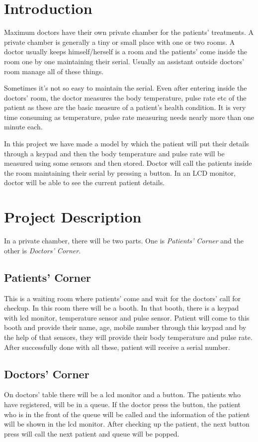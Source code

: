 \documentclass[a4paper,12pt]{article}
\begin{document}
	\thispagestyle{empty}
	\pagebreak
	\tableofcontents
	\thispagestyle{empty}
	\clearpage
	
	
	\section{Introduction}
	Maximum doctors have their own private chamber for the patients' treatments. A private chamber is generally a tiny or small place with one or two rooms. A doctor usually keeps himself/herself is a room and the patients' come inside the room one by one maintaining their serial. Usually an assistant outside doctors' room manage all of these things.
	
	Sometimes it's not so easy to maintain the serial. Even after entering inside the doctors' room, the doctor measures the body temperature, pulse rate etc of the patient as these are the basic measure of a patient's health condition. It is very time consuming as temperature, pulse rate measuring needs nearly more than one minute each. 
	
	In this project we have made a model by which the patient will put their details through a keypad and then the body temperature and pulse rate will be measured using some sensors and then stored. Doctor will call the patients inside the room maintaining their serial by pressing a button. In an LCD monitor, doctor will be able to see the current patient details.
	\section{Project Description}
	In a private chamber, there will be two parts. One is \emph{Patients' Corner} and the other is \emph{Doctors' Corner}.
	\subsection{Patients' Corner}
	This is a waiting room where patients' come and wait for the doctors' call for checkup. In this room there will be a booth. In that booth, there is a keypad with lcd monitor, temperature sensor and pulse sensor. Patient will come to this booth and provide their name, age, mobile number through this keypad and by the help of that sensors, they will provide their body temperature and pulse rate. After successfully done with all these, patient will receive a serial number.
	\subsection{Doctors' Corner}
	On doctors' table there will be a lcd monitor and a button. The patients who have registered, will be in a queue. If the doctor press the button, the patient who is in the front of the queue will be called and the information of the patient will be shown in the lcd monitor. After checking up the patient, the next button press will call the next patient and queue will be popped.
	\pagebreak
\end{document}
